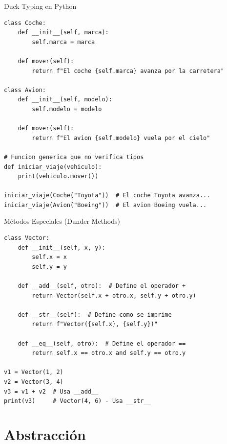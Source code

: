 \documentclass[aspectratio=169]{beamer}
\begin{document}
\begin{frame}[fragile]{Duck Typing en Python}
    \begin{lstlisting}[title=No Importa el Tipo, Importa el Comportamiento]
class Coche:
    def __init__(self, marca):
        self.marca = marca
    
    def mover(self):
        return f"El coche {self.marca} avanza por la carretera"

class Avion:
    def __init__(self, modelo):
        self.modelo = modelo
    
    def mover(self):
        return f"El avion {self.modelo} vuela por el cielo"

# Funcion generica que no verifica tipos
def iniciar_viaje(vehiculo):
    print(vehiculo.mover())

iniciar_viaje(Coche("Toyota"))  # El coche Toyota avanza...
iniciar_viaje(Avion("Boeing"))  # El avion Boeing vuela...
    \end{lstlisting}
\end{frame}

\begin{frame}[fragile]{Métodos Especiales (Dunder Methods)}
    \begin{lstlisting}[title=Polimorfismo con Operadores]
class Vector:
    def __init__(self, x, y):
        self.x = x
        self.y = y
    
    def __add__(self, otro):  # Define el operador +
        return Vector(self.x + otro.x, self.y + otro.y)
    
    def __str__(self):  # Define como se imprime
        return f"Vector({self.x}, {self.y})"
    
    def __eq__(self, otro):  # Define el operador ==
        return self.x == otro.x and self.y == otro.y

v1 = Vector(1, 2)
v2 = Vector(3, 4)
v3 = v1 + v2  # Usa __add__
print(v3)     # Vector(4, 6) - Usa __str__
    \end{lstlisting}
\end{frame}

\section{Abstracción}
\end{document}
